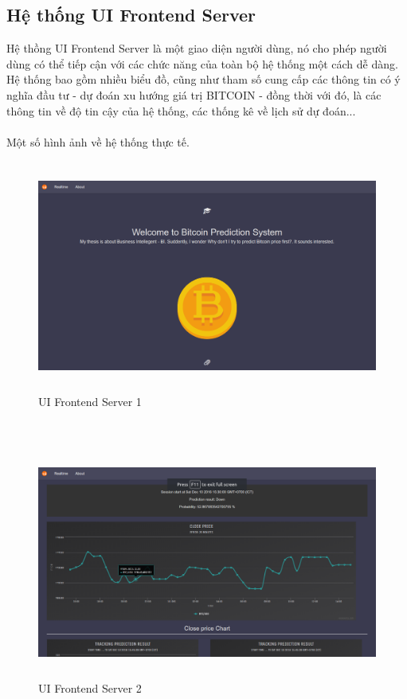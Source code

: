 \subsection{Hệ thống UI Frontend Server}
Hệ thồng UI Frontend Server là một giao diện người dùng, nó cho phép người 
dùng có thể tiếp cận với các chức năng của toàn bộ hệ thống một cách dễ dàng. 
Hệ thống bao gồm nhiều biểu đồ, cũng như tham số cung cấp các thông tin có ý 
nghĩa đầu tư - dự đoán xu hướng giá trị BITCOIN - đồng thời với đó, là các 
thông tin về độ tin cậy của hệ thống, các thống kê về lịch sử dự đoán...\\\\
Một số hình ảnh về hệ thống thực tế.\\
\begin{figure}[h!]
\centering
\includegraphics[height=3in, keepaspectratio=true]{1.png}
\caption{UI Frontend Server 1}
\end{figure}\\
\begin{figure}[h!]
\centering
\includegraphics[height=3in, keepaspectratio=true]{2.png}
\caption{UI Frontend Server 2}
\end{figure}\\\\
